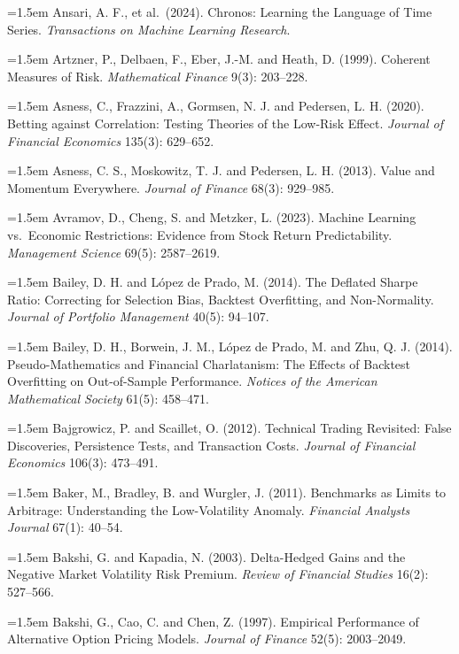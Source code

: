 \hangindent=1.5em Ansari, A. F., et al.\ (2024). Chronos: Learning the Language of Time Series. \emph{Transactions on Machine Learning Research}.

\hangindent=1.5em Artzner, P., Delbaen, F., Eber, J.-M. and Heath, D. (1999). Coherent Measures of Risk. \emph{Mathematical Finance} 9(3): 203--228.

\hangindent=1.5em Asness, C., Frazzini, A., Gormsen, N. J. and Pedersen, L. H. (2020). Betting against Correlation: Testing Theories of the Low-Risk Effect. \emph{Journal of Financial Economics} 135(3): 629--652.

\hangindent=1.5em Asness, C. S., Moskowitz, T. J. and Pedersen, L. H. (2013). Value and Momentum Everywhere. \emph{Journal of Finance} 68(3): 929--985.

\hangindent=1.5em Avramov, D., Cheng, S. and Metzker, L. (2023). Machine Learning vs.\ Economic Restrictions: Evidence from Stock Return Predictability. \emph{Management Science} 69(5): 2587--2619.

\hangindent=1.5em Bailey, D. H. and L\'opez de Prado, M. (2014). The Deflated Sharpe Ratio: Correcting for Selection Bias, Backtest Overfitting, and Non-Normality. \emph{Journal of Portfolio Management} 40(5): 94--107.

\hangindent=1.5em Bailey, D. H., Borwein, J. M., L\'opez de Prado, M. and Zhu, Q. J. (2014). Pseudo-Mathematics and Financial Charlatanism: The Effects of Backtest Overfitting on Out-of-Sample Performance. \emph{Notices of the American Mathematical Society} 61(5): 458--471.

\hangindent=1.5em Bajgrowicz, P. and Scaillet, O. (2012). Technical Trading Revisited: False Discoveries, Persistence Tests, and Transaction Costs. \emph{Journal of Financial Economics} 106(3): 473--491.

\hangindent=1.5em Baker, M., Bradley, B. and Wurgler, J. (2011). Benchmarks as Limits to Arbitrage: Understanding the Low-Volatility Anomaly. \emph{Financial Analysts Journal} 67(1): 40--54.

\hangindent=1.5em Bakshi, G. and Kapadia, N. (2003). Delta-Hedged Gains and the Negative Market Volatility Risk Premium. \emph{Review of Financial Studies} 16(2): 527--566.

\hangindent=1.5em Bakshi, G., Cao, C. and Chen, Z. (1997). Empirical Performance of Alternative Option Pricing Models. \emph{Journal of Finance} 52(5): 2003--2049.

